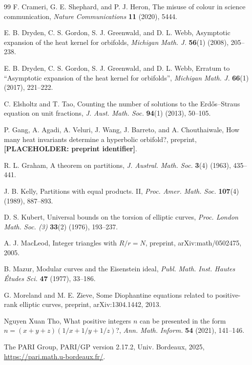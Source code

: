 \documentclass[10pt]{article}
\begin{document}
\begin{thebibliography}{99}
F. Crameri, G. E. Shephard, and P. J. Heron, The misuse of colour in science communication, \textit{Nature Communications} \textbf{11} (2020), 5444.

E. B. Dryden, C. S. Gordon, S. J. Greenwald, and D. L. Webb, Asymptotic expansion of the heat kernel for orbifolds, \textit{Michigan Math. J.} \textbf{56}(1) (2008), 205--238.

E. B. Dryden, C. S. Gordon, S. J. Greenwald, and D. L. Webb, Erratum to ``Asymptotic expansion of the heat kernel for orbifolds'', \textit{Michigan Math. J.} \textbf{66}(1) (2017), 221--222.

C. Elsholtz and T. Tao, Counting the number of solutions to the Erd\H{o}s--Straus equation on unit fractions, \textit{J. Aust. Math. Soc.} \textbf{94}(1) (2013), 50--105.

P. Gang, A. Agadi, A. Veluri, J. Wang, J. Barreto, and A. Chouthaiwale, How many heat invariants determine a hyperbolic orbifold?, preprint, \textbf{[PLACEHOLDER: preprint identifier]}.

R. L. Graham, A theorem on partitions, \textit{J. Austral. Math. Soc.} \textbf{3}(4) (1963), 435--441.

J. B. Kelly, Partitions with equal products. II, \textit{Proc. Amer. Math. Soc.} \textbf{107}(4) (1989), 887--893.

D. S. Kubert, Universal bounds on the torsion of elliptic curves, \textit{Proc. London Math. Soc. (3)} \textbf{33}(2) (1976), 193--237.

A. J. MacLeod, Integer triangles with $R/r=N$, preprint, arXiv:math/0502475, 2005.

B. Mazur, Modular curves and the Eisenstein ideal, \textit{Publ. Math. Inst. Hautes \'Etudes Sci.} \textbf{47} (1977), 33--186.

G. Moreland and M. E. Zieve, Some Diophantine equations related to positive-rank elliptic curves, preprint, arXiv:1304.1442, 2013.

Nguyen Xuan Tho, What positive integers $n$ can be presented in the form $n=(x+y+z)(1/x+1/y+1/z)$?, \textit{Ann. Math. Inform.} \textbf{54} (2021), 141--146.

The PARI Group, PARI/GP version 2.17.2, Univ. Bordeaux, 2025, \url{https://pari.math.u-bordeaux.fr/}.


\end{thebibliography}
\end{document}

